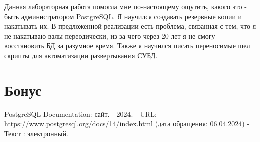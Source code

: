 \documentclass{article}
\begin{document}
Данная лабораторная работа помогла мне по-настоящему ощутить, какого это - быть администратором PostgreSQL. Я научился создавать резервные копии и накатывать их. В предложенной реализации есть проблема, связанная с тем, что я не накатываю валы переодически, из-за чего через 20 лет я не смогу восстановить БД за разумное время. Также я научился писать переносимые шел скрипты для автоматизации развертывания СУБД.

\section{Бонус}



\begin{thebibliography}{99}
    PostgreSQL Documentation: сайт. - 2024.
    - URL: \url{https://www.postgresql.org/docs/14/index.html} (дата обращения: 06.04.2024) - Текст : электронный.
\end{thebibliography}
\end{document}
